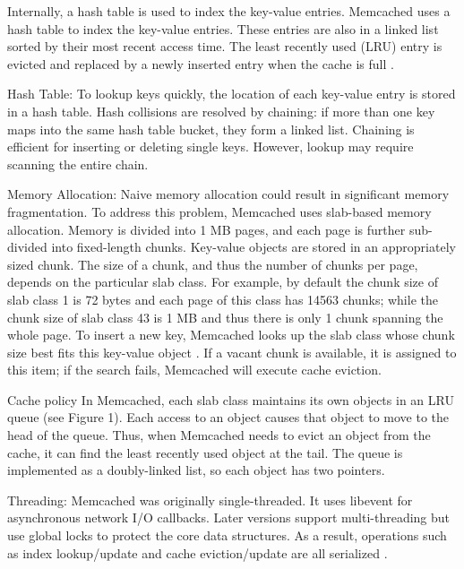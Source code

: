\documentclass[9pt,twocolumn,twoside]{../../styles/osajnl}
\begin{document}
Internally, a hash table is used to index the key-value
entries. Memcached uses a hash table to index the key-value
entries. These entries are also in a linked list sorted by their most
recent access time.  The least recently used (LRU) entry is evicted
and replaced by a newly inserted entry when the cache is full
\cite{www-memcached-blog}.


Hash Table: To lookup keys quickly, the location of each key-value
entry is stored in a hash table. Hash collisions are resolved by
chaining: if more than one key maps into the same hash table bucket,
they form a linked list.  Chaining is efficient for inserting or
deleting single keys.  However, lookup may require scanning the entire
chain.


Memory Allocation: Naive memory allocation could result in significant
memory fragmentation.  To address this problem, Memcached uses
slab-based memory allocation. Memory is divided into 1 MB pages, and
each page is further sub-divided into fixed-length chunks. Key-value
objects are stored in an appropriately sized chunk. The size of a chunk,
and thus the number of chunks per page, depends on the particular slab
class. For example, by default the chunk size of slab class 1 is 72
bytes and each page of this class has 14563 chunks; while the chunk
size of slab class 43 is 1 MB and thus there is only 1 chunk spanning
the whole page.  To insert a new key, Memcached looks up the slab
class whose chunk size best fits this key-value object
\cite{www-memcached-blog}. If a vacant chunk is available, it is
assigned to this item; if the search fails, Memcached will execute
cache eviction.


Cache policy In Memcached, each slab class maintains its own objects
in an LRU queue (see Figure 1). Each access to an object causes that
object to move to the head of the queue. Thus, when Memcached needs to
evict an object from the cache, it can find the least recently used
object at the tail. The queue is implemented as a doubly-linked list,
so each object has two pointers.


Threading: Memcached was originally single-threaded.  It uses libevent
for asynchronous network I/O callbacks. Later versions support
multi-threading but use global locks to protect the core data
structures. As a result, operations such as index lookup/update and
cache eviction/update are all serialized \cite{www-memcached-blog}.
\end{document}
